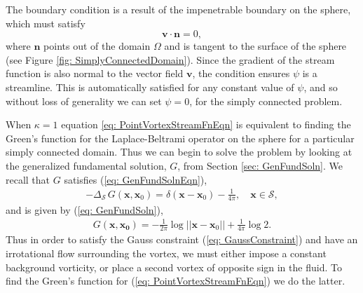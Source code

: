 \documentclass{sfuthesis}
\begin{document}
The boundary condition is a result of the impenetrable boundary on the sphere, which must satisfy
	\[\mathbf{v}\cdot \mathbf{n}=0, \]
where $\mathbf{n}$ points out of the domain $\Omega$ and is tangent to the surface of the sphere (see Figure \ref{fig: SimplyConnectedDomain}). Since the gradient of the stream function is also normal to the vector field $\mathbf{v}$, the condition ensures $\psi$ is a streamline. This is automatically satisfied for any constant value of $\psi$, and so without loss of generality we can set $\psi=0$, for the simply connected problem. 

When $\kappa=1$ equation \eqref{eq: PointVortexStreamFnEqn} is equivalent to finding the Green's function for the Laplace-Beltrami operator on the sphere for a particular simply connected domain. Thus we can begin to solve the problem by looking at the generalized fundamental solution, $G$, from Section \ref{sec: GenFundSoln}. 
We recall that $G$ satisfies (\ref{eq: GenFundSolnEqn}),  
\begin{align*}
	-{\Delta}_{\mathcal{S}\ } G(\mathbf{x}, {\mathbf{x}}_0) = \delta(\mathbf{x}-{\mathbf{x}}_0) - \frac{1}{4\pi}, \quad \mathbf{x} \in \mathcal{S}, 
\end{align*}
and is given by (\ref{eq: GenFundSoln}), 
\begin{align*}
	G(\mathbf{x},\mathbf{x_0})=-\frac{1}{2\pi}\log||\mathbf{x}-{\mathbf{x}}_0||+\frac{1}{4\pi}\log2.
\end{align*}
Thus in order to satisfy the Gauss constraint (\ref{eq: GaussConstraint}) and have an irrotational flow surrounding the vortex, we must either impose a constant background vorticity, or place a second vortex of opposite sign in the fluid. To find the Green's function for (\ref{eq: PointVortexStreamFnEqn}) we do the latter. 
\end{document}

